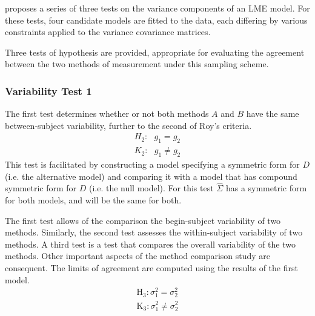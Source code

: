 \documentclass[12pt, a4paper]{report}
\theoremstyle{plain}
\theoremstyle{definition}
\theoremstyle{remark}
\begin{document}
	
	
	
	\citet{ARoy2009} proposes a series of three tests on the variance components of an LME model. For these tests, four candidate models are fitted to the data, each differing by various constraints applied to the variance covariance matrices. 
	
	
	
	
	Three tests of hypothesis are provided, appropriate for evaluating the agreement between the two methods of measurement under this sampling scheme. 
	
	\subsubsection{Variability Test 1}
	The first test determines whether or not both methods $A$ and $B$ have the same between-subject variability, further to the second of Roy's criteria.
	\begin{eqnarray*}
		H_{2}: \mbox{ }g_{1}  = g_{2} \\
		K_{2}: \mbox{ }g_{1}  \neq g_{2}
	\end{eqnarray*}
	This test is facilitated by constructing a model specifying a symmetric form for $D$ (i.e. the alternative model) and comparing it with a model that has compound symmetric form for $D$ (i.e. the null model). For this test ${\hat{\Sigma}}$ has a symmetric form for both models, and will be the same for both.
	
	
	
	The first test allows of the comparison the begin-subject variability of two methods. Similarly, the second test assesses the within-subject variability of two methods. A third test is a test that compares the overall variability of the two methods. Other important aspects of the method comparison study are consequent. The limits of agreement are computed using the results of the first model.
	\begin{eqnarray*}
		\operatorname{H_3} : \sigma^2_1 = \sigma^2_2 \\
		\operatorname{K_3} : \sigma^2_1 \neq \sigma^2_2
	\end{eqnarray*}
	
\end{document}
